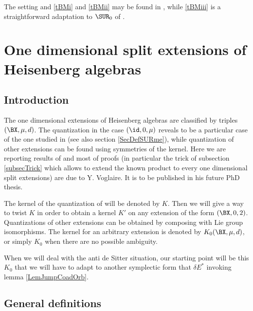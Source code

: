 The setting and \ref{tBMi} and \ref{tBMii} may be found in \cite{Biel-Massar}, while \ref{tBMiii} is a straightforward adaptation  to $\SUR_0$ of \cite{lcBBM}.


%
   \section{One dimensional split extensions of Heisenberg algebras} \label{SecExtHeiz}
%

\subsection{Introduction}

The one dimensional extensions of Heisenberg algebras are classified by triples $(\BX,\mu,d)$. The quantization in the case $(\id,0,\mu)$  reveals to be a particular case of the one studied in \cite{Biel-Massar} (see also section \ref{SecDefSURme}),%
while quantization of other extensions can be found using symmetries of the kernel. Here we are reporting results of \cite{articleBVCS} and most of proofs (in particular the trick of subsection \ref{subsecTrick} %
which allows to extend the known product to every one dimensional split extensions) are due to Y. Voglaire. It is to be published in his future PhD thesis.

The kernel of the quantization of \cite{Biel-Massar} will be denoted by $K$.  Then we will give a way to twist $K$ in order to obtain a kernel $K'$ on any extension of the form $(\BX,0,2)$. Quantizations of other extensions can be obtained by composing with Lie group isomorphisms. The kernel for an arbitrary extension is denoted by $K_{0}(\BX,\mu,d)$, or simply $K_{0}$ when there are no possible ambiguity.

When we will deal with the anti de Sitter situation, our starting point will be this $K_{0}$ that we will have to adapt to another symplectic form that $\delta E^*$ invoking lemma \ref{LemJumpCoadOrb}.

\subsection{General definitions}

